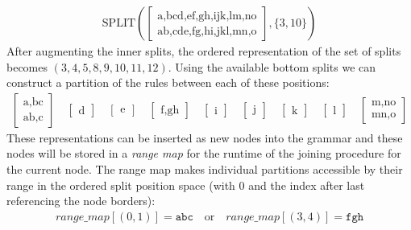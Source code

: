 {
\ttfamily
\begin{align*}
    \text{SPLIT}\left(
    \begin{bmatrix}
        \text{a,bcd,ef,gh,ijk,lm,no}\\
        \text{ab,cde,fg,hi,jkl,mn,o}
    \end{bmatrix}
    , \{3, 10\}
    \right)
\end{align*}
}
After augmenting the inner splits, the ordered representation of the set of splits becomes $(3, 4, 5, 8, 9, 10, 11, 12)$. Using the available bottom splits we can construct a partition of the rules between each of these positions:
{
    \ttfamily
    \noindent
    \begin{align*}
        \begin{bmatrix}
            \text{a,bc}\\
            \text{ab,c}
        \end{bmatrix}
        \quad
        \begin{bmatrix}
            \text{d}
        \end{bmatrix}
        \quad
        \begin{bmatrix}
            \text{e}
        \end{bmatrix}
        \quad
        \begin{bmatrix}
            \text{f,gh}
        \end{bmatrix}
        \quad
        \begin{bmatrix}
            \text{i}
        \end{bmatrix}
        \quad
        \begin{bmatrix}
            \text{j}
        \end{bmatrix}
        \quad
        \begin{bmatrix}
            \text{k}
        \end{bmatrix}
        \quad
        \begin{bmatrix}
            \text{l}
        \end{bmatrix}
        \quad
        \begin{bmatrix}
            \text{m,no}\\
            \text{mn,o}
        \end{bmatrix}
    \end{align*}
}
These representations can be inserted as new nodes into the grammar and these nodes will be stored in a \textit{range map} for the runtime of the joining procedure for the current node. The range map makes individual partitions accessible by their range in the ordered split position space (with $0$ and the index after last referencing the node borders):
\begin{align*}
    range\_map[(0, 1)] = \texttt{abc}
    \quad
    \text{or}
    \quad
    range\_map[(3, 4)] = \texttt{fgh}
\end{align*}

